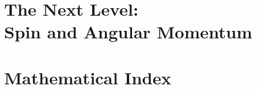 \documentclass[12pt,letterpaper]{book}
\begin{document}


\chapter{The Next Level: \\ Spin and Angular Momentum}


\chapter{Mathematical Index}

\end{document}

